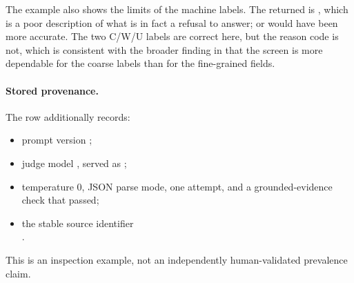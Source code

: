 The example also shows the limits of the machine labels. The returned
 is , which is a poor description of what is in fact a
refusal to answer;  or  would have been more accurate. The two C/W/U labels are
correct here, but the reason code is not, which is consistent with the broader finding in
 that the screen is more dependable for the coarse labels than for the fine-grained
fields.

\paragraph{Stored provenance.} The row additionally records:

\begin{itemize}[leftmargin=*,nosep]
  \item prompt version ;
  \item judge model , served as ;
  \item temperature 0, JSON parse mode, one attempt, and a grounded-evidence check that passed;
  \item the stable source identifier\\
        .
\end{itemize}

This is an inspection example, not an independently human-validated prevalence claim.
